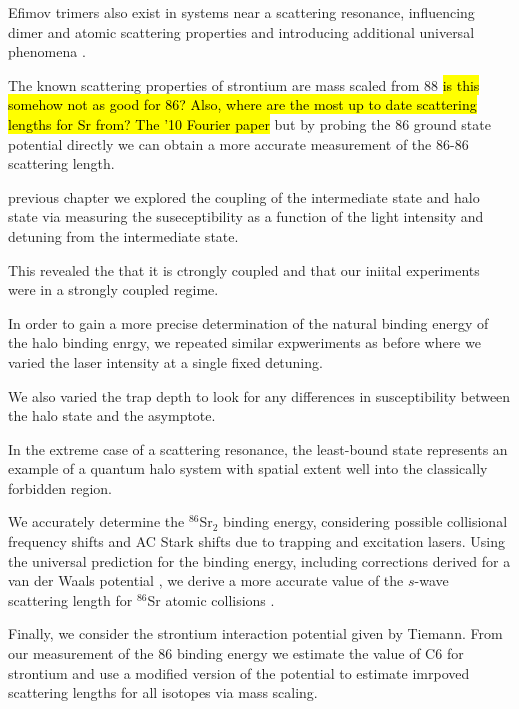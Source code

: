 Efimov trimers also exist in systems near a scattering resonance, influencing dimer and atomic scattering properties and introducing additional universal phenomena \cite{bha07,nen17}.



The known scattering properties of strontium are mass scaled from 88 \hl{is this somehow not as good for 86? Also, where are the most up to date scattering lengths for Sr from?
The '10 Fourier paper} but by probing the 86 ground state potential directly we can obtain a more accurate measurement of the 86-86 scattering length.


previous chapter we explored the coupling of the intermediate state and halo state via measuring the suseceptibility as a function of the light intensity and detuning from the intermediate state.

This revealed the that it is ctrongly coupled and that our iniital experiments were in a strongly coupled regime.

In order to gain a more precise determination of the natural binding energy of the halo binding enrgy, we repeated similar expweriments as before where we varied the laser intensity at a single fixed detuning.

We also varied the trap depth to look for any differences in susceptibility between the halo state and the asymptote.


In the extreme case of a scattering resonance, the least-bound state represents an example of a quantum halo system \cite{jrf04} with spatial extent well into the classically forbidden region. 



We accurately determine the $^{86}$Sr$_2$ binding energy, considering possible collisional frequency shifts and AC Stark shifts due to trapping and excitation lasers. 
Using the universal prediction for the binding energy, including corrections derived for a van der Waals potential \cite{gfl93,gao01,gao04}, we derive a more accurate value of the $s$-wave scattering length for $^{86}$Sr atomic collisions \cite{skt10,mmp08}.

Finally, we consider the strontium interaction potential given by Tiemann.
From our measurement of the 86 binding energy we estimate the value of C6 for strontium and use a modified version of the potential to estimate imrpoved scattering lengths for all isotopes via mass scaling.



